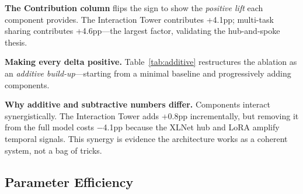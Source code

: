\documentclass[10pt,twocolumn]{article}
\begin{document}
\textbf{The Contribution column} flips the sign to show the \emph{positive lift} each component provides. The Interaction Tower contributes +4.1pp; multi-task sharing contributes +4.6pp---the largest factor, validating the hub-and-spoke thesis.

\textbf{Making every delta positive.} Table~\ref{tab:additive} restructures the ablation as an \emph{additive build-up}---starting from a minimal baseline and progressively adding components.

\begin{table}[t]
\centering
\caption{Additive build-up: starting from a single-task MLP baseline, each row adds one component. All deltas are positive, showing incremental gains.}
\label{tab:additive}
\end{table}

\textbf{Why additive and subtractive numbers differ.} Components interact synergistically. The Interaction Tower adds +0.8pp incrementally, but removing it from the full model costs $-$4.1pp because the XLNet hub and LoRA amplify temporal signals. This synergy is evidence the architecture works as a coherent system, not a bag of tricks.

\subsection{Parameter Efficiency}
\end{document}
